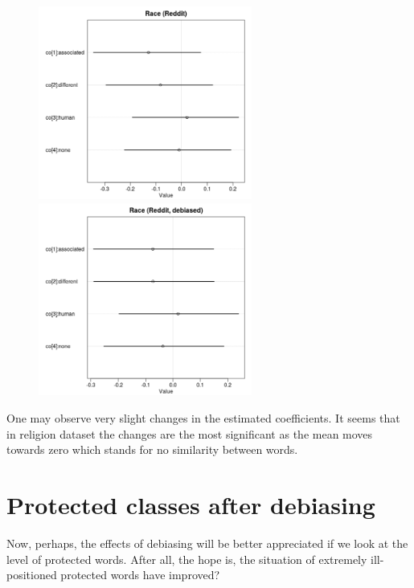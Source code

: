 \documentclass[
  12pt,
]{book}
\begin{document}
\begin{center}
\begin{figure}[!htb]
   
  \begin{minipage}{0.55\textwidth}
\includegraphics[width=7cm]{../images/raceCoeffs.jpeg}
\end{minipage}
   \begin {minipage}{0.43\textwidth}
    \includegraphics[width=7cm]{../images/debiasedRaceRedditCoeffs.jpeg}
   \end{minipage}
\end{figure}

\end{center}

One may observe very slight changes in the estimated coeﬀicients. It seems that in religion dataset the changes are the most significant as the mean moves towards zero which stands for no similarity between words.

\hypertarget{protected-classes-after-debiasing}{%
\section{Protected classes after debiasing}\label{protected-classes-after-debiasing}}

Now, perhaps, the effects of debiasing will be better appreciated if we look at the level of protected words. After all, the hope is, the situation of extremely ill-positioned protected words have improved?
\end{document}
